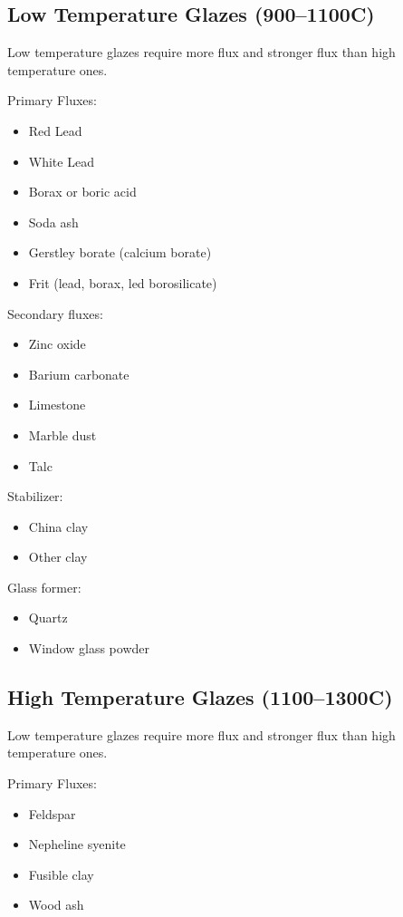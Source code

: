 \subsection{Low Temperature Glazes (900--1100\degree C)}
Low temperature glazes require more flux and stronger flux than high 
temperature ones.

Primary Fluxes:
\begin{itemize}
\item Red Lead
\item White Lead
\item Borax or boric acid
\item Soda ash
\item Gerstley borate (calcium borate)
\item Frit (lead, borax, led borosilicate)
\end{itemize}

Secondary fluxes:
\begin{itemize}
\item Zinc oxide
\item Barium carbonate
\item Limestone
\item Marble dust
\item Talc
\end{itemize}

Stabilizer:
\begin{itemize}
\item China clay
\item Other clay
\end{itemize}

Glass former:
\begin{itemize}
\item Quartz
\item Window glass powder
\end{itemize}

\subsection{High Temperature Glazes (1100--1300\degree C)}
Low temperature glazes require more flux and stronger flux than high 
temperature ones.

Primary Fluxes:
\begin{itemize}
  \item Feldspar
  \item Nepheline syenite
  \item Fusible clay
  \item Wood ash
\end{itemize}

